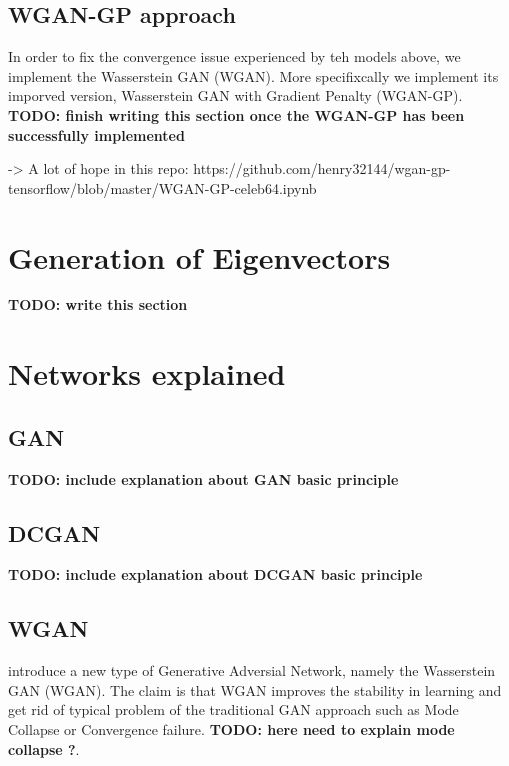 \documentclass{article}
\begin{document}
\subsection{WGAN-GP approach}

In order to fix the convergence issue experienced by teh models above, we implement the Wasserstein GAN (WGAN). More specifixcally we implement its imporved version, Wasserstein GAN with Gradient Penalty (WGAN-GP). \textbf{TODO: finish writing this section once the WGAN-GP has been successfully implemented}

-> A lot of hope in this repo: https://github.com/henry32144/wgan-gp-tensorflow/blob/master/WGAN-GP-celeb64.ipynb

\section{Generation of Eigenvectors}

\textbf{TODO: write this section}


\section{Networks explained}

\subsection{GAN}

\cite{goodfellow2020generative}
\textbf{TODO: include explanation about GAN basic principle}

\subsection{DCGAN}

\cite{radford2015unsupervised}

\textbf{TODO: include explanation about DCGAN basic principle}

\subsection{WGAN}

\cite{arjovsky2017wasserstein} introduce a new type of Generative Adversial Network, namely the Wasserstein GAN (WGAN). The claim is that WGAN improves the stability in learning and get rid of typical problem of the traditional GAN approach such as Mode Collapse or Convergence failure. \textbf{TODO: here need to explain mode collapse ?}. 
\end{document}
